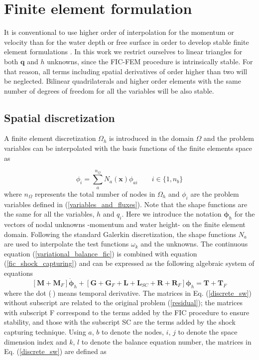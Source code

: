 \documentclass[a4paper,12pt]{elsarticle}
\begin{document}
\section{Finite element formulation}
\label{sec:fem} 

It is conventional to use higher order of interpolation for the momentum or velocity than for the water depth or free surface in order to develop stable finite element formulations \cite{hood1974,heniche2000,bercovier1979}. In this work we restrict ourselves to linear triangles for both $\mathbf{q}$ and $h$ unknowns, since the FIC-FEM procedure is intrinsically stable. For that reason, all terms including spatial derivatives of order higher than two will be neglected. Bilinear quadrilaterals and higher order elements with the same number of degrees of freedom for all the variables will be also stable.


\subsection{Spatial discretization}

A finite element discretization $\Omega_h$ is introduced in the domain $\Omega$ and the problem variables can be interpolated with the basis functions of the finite elements space as

\begin{equation}
\phi_i = \sum_a^{n_\Omega} N_a(\mathbf{x})\phi_{ai} \qquad i \in \{1,n_b\}
\end{equation}
where $n_\Omega$ represents the total number of nodes in $\Omega_h$ and $\phi_i$ are the problem variables defined in (\ref{variables_and_fluxes}).
Note that the shape functions are the same for all the variables, $h$ and $q_i$.
Here we introduce the notation $\bm{\phi}_h$ for the vectors of nodal unknowns -momentum and water height- on the finite element domain. Following the standard Galerkin discretization, the shape functions $N_a$ are used to interpolate the test functions $\omega_k$ and the unknowns. The continuous equation (\ref{variational_balance_fic}) is combined with equation (\ref{fic_shock_capturing}) and can be expressed as the following algebraic system of equations
\begin{equation} \label{discrete_sw}
[\mathbf{M} + \mathbf{M}_F] \dot{\bm{\phi}}_h
+ [\mathbf{G} + \mathbf{G}_F + \mathbf{L} + \mathbf{L}_{SC} + \mathbf{R} + \mathbf{R}_F] \bm{\phi}_h
= \mathbf{T} + \mathbf{T}_F
\end{equation}
where the dot ($\dot{\ }$) means temporal derivative. The matrices in Eq. (\ref{discrete_sw}) without subscript are related to the original problem (\ref{residual}); the matrices with subscript F correspond to the terms added by the FIC procedure to ensure stability, and those with the subscript SC are the terms added by the shock capturing technique. Using $a$, $b$ to denote the nodes, $i$, $j$ to denote the space dimension index and $k$, $l$ to denote the balance equation number, the matrices in Eq. (\ref{discrete_sw}) are defined as
\end{document}
